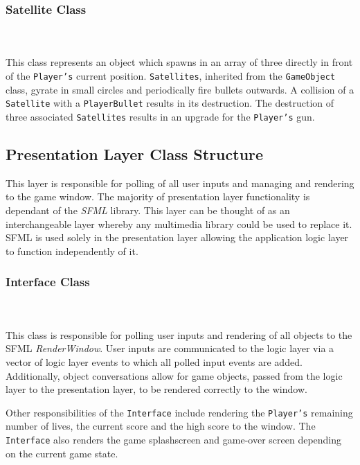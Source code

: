 \documentclass[10pt,twocolumn]{witseiepaper}
\begin{document}
\subsubsection{Satellite Class}
~\\
~\\
This class represents an object which spawns in an array of three directly in front of the \texttt{Player's} current position. \texttt{Satellites}, inherited from the \texttt{GameObject} class, gyrate in small circles and periodically fire bullets outwards.
A collision of a \texttt{Satellite} with a \texttt{PlayerBullet} results in its destruction.
The destruction of three associated \texttt{Satellites} results in an upgrade for the \texttt{Player's} gun.

\subsection{Presentation Layer Class Structure}

This layer is responsible for polling of all user inputs and managing and rendering to the game window. The majority of presentation layer functionality is dependant of the \textit{SFML} library. This layer can be thought of as an interchangeable layer whereby any multimedia library could be used to replace it. SFML is used solely in the presentation layer allowing the application logic layer to function independently of it.

\subsubsection{Interface Class}
~\\
~\\
This class is responsible for polling user inputs and rendering of all objects to the SFML \textit{RenderWindow}. User inputs are communicated to the logic layer via a vector of logic layer events to which all polled input events are added. Additionally, object conversations allow for game objects, passed from the logic layer to the presentation layer, to be rendered correctly to the window. 

Other responsibilities of the \texttt{Interface} include rendering the \texttt{Player's} remaining number of lives, the current score and the high score to the window. The \texttt{Interface} also renders the game splashscreen and game-over screen depending on the current game state.

\end{document}
